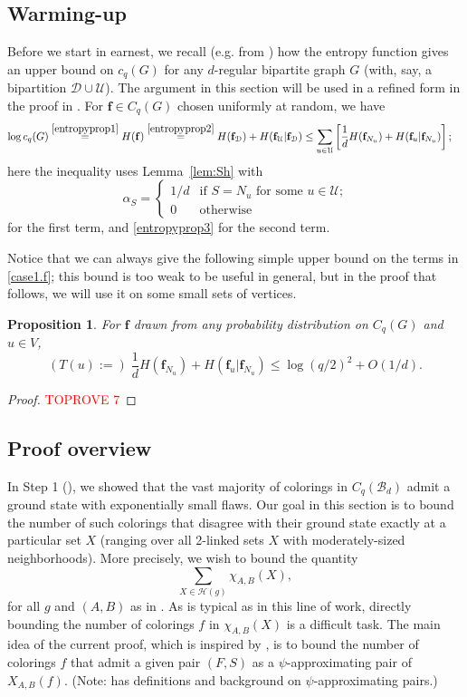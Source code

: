 \documentclass{amsart}
\newtheorem{prop}[thm]{Proposition}
\theoremstyle{definition}
\newcommand{\cB}{\mathcal{B} }
\newcommand{\cD}{\mathcal{D} }
\newcommand{\cH}{\mathcal{H} }
\newcommand{\cU}{\mathcal{U} }
\newcommand{\bbf}{\mathbf{f}}
\newcommand{\beq}[1]{\begin{equation}\label{#1}}
\newcommand{\enq}[0]{\end{equation}}
\newcommand{\0}[0]{\emptyset}
\begin{document}
\subsection{Warming-up}\label{subsec.entropy function} Before we start in earnest, we recall (e.g. from \cite{KPq}) how the entropy function gives an upper bound on $c_q(G)$ for any $d$-regular bipartite graph $G$ (with, say, a bipartition $\cD \cup \cU$). The argument in this section will be used in a refined form in the proof in . For $\bbf \in C_q(G)$ chosen uniformly at random, we have
\beq{case1.f} \begin{split}\log c_q(G) \stackrel{\eqref{entropyprop1}}{=} H(\bbf)&\stackrel{\eqref{entropyprop2}}{=}H(\bbf_\cD)+H(\bbf_\cU|\bbf_\cD)\le \sum_{u \in \cU}\left[\frac1dH(\bbf_{N_u})+H(\bbf_u|\bbf_{N_u})\right];
\end{split}\enq
here the inequality uses
Lemma~\ref{lem:Sh} with
\beq{alphaS}
\alpha_S=\left\{\begin{array}{ll}
1/d&\mbox{if $S=N_u$ for some $u\in \cU$;}\\
0&\mbox{otherwise}
\end{array}\right.
\enq
for the first term, and \eqref{entropyprop3} for the second term.


Notice that we can always give the following simple upper bound on the terms in \eqref{case1.f}; this bound is too weak to be useful in general, but in the proof that follows, we will use it on some small sets of vertices.

\begin{prop}\label{entropy.bm}
For $\bbf$ drawn from \emph{any} probability distribution on $C_q(G)$ and $u \in V$, 
\beq{eq.Tu.def}(T(u):=) \; \frac1dH(\bbf_{N_u})+H(\bbf_u|\bbf_{N_u}) \le \log (q/2)^2 +O(1/d).\enq
\end{prop}


\begin{proof}\textcolor{red}{TOPROVE 7}\end{proof}

\subsection{Proof overview} 
In Step 1 (), we showed that the vast majority of colorings in $C_q(\cB_d)$ admit a ground state with exponentially small flaws. Our goal in this section is to bound the number of such colorings that disagree with their ground state exactly at a particular set $X$ (ranging over all 2-linked sets $X$ with moderately-sized neighborhoods). More precisely, we wish to bound the quantity
\beq{quantity}
\sum_{X \in \cH(g)} \chi_{A,B}(X),
\enq
for all $g$ and $(A,B)$ as in .
As is typical as in this line of work, directly bounding the number of colorings $f$ in $\chi_{A,B}(X)$ is a difficult task. The main idea of the current proof, which is inspired by \cite{KPq, misqn}, is to bound the number of colorings $f$ that admit a given pair $(F,S)$ as a $\psi$-approximating pair of $X_{A,B}(f)$. (Note:  has definitions and background on $\psi$-approximating pairs.) 
\end{document}
